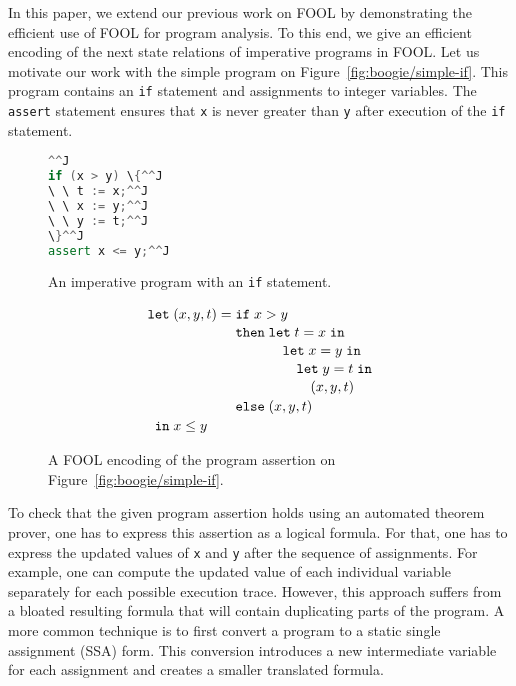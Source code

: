 In this paper, we extend our previous work on FOOL by demonstrating the efficient use of FOOL for program analysis. To this end, we give an efficient encoding of the next state relations of imperative programs in FOOL. Let us motivate our work with the simple program on Figure~\ref{fig:boogie/simple-if}. This program contains an \verb'if' statement and assignments to integer variables. The \verb'assert' statement ensures that \verb'x' is never greater than \verb'y' after execution of the \verb'if' statement.

\begin{figure}
  \parbox{4.6cm}{
    \vspace{2em}\hspace{0.6cm}
    \begin{minipage}{3cm}
    \begin{lstlisting}[language=cpp]^^J
if (x > y) \{^^J
\ \ t := x;^^J
\ \ x := y;^^J
\ \ y := t;^^J
\}^^J
assert x <= y;^^J
    \end{lstlisting}
    \end{minipage}
    \vspace{1.5em}
    \caption{An imperative program with an \texttt{if} statement.}
    \label{fig:boogie/simple-if}
  }
\quad
  \begin{minipage}{6cm}
\[
  \letnl{(x,y,t)}{\itenll{x > y}
                 {\letinnl{t}{x}
                          {\letinnl{x}{y}
                                   {\letinnl{y}{t}
                                            {(x,y,t)}}}}
                 {(x,y,t)}}
        {x \le y}
\]
    \caption{A FOOL encoding of the program assertion on Figure~\ref{fig:boogie/simple-if}.}
    \label{fig:boogie/simple-if-fool}
  \end{minipage}
\end{figure}

To check that the given program assertion holds using an automated theorem prover, one has to express this assertion as a logical formula. For that, one has to express the updated values of \verb'x' and \verb'y' after the sequence of assignments. For example, one can compute the updated value of each individual variable separately for each possible execution trace. However, this approach suffers from a bloated resulting formula that will contain duplicating parts of the program. A more common technique is to first convert a program to a static single assignment (SSA) form. This conversion introduces a new intermediate variable for each assignment and creates a smaller translated formula.

